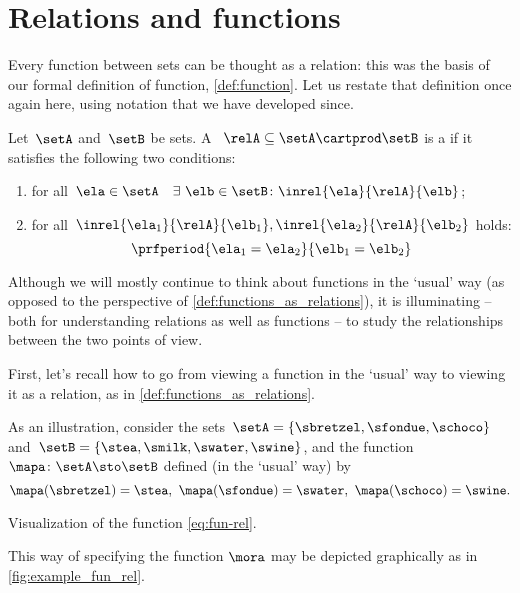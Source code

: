 
\section{Relations and functions}


Every function between sets can be thought as a relation: this was the basis of our formal definition of function, \cref{def:function}.
Let us restate that definition once again here, using notation that we have developed since.

\begin{definition}
    \label{def:functions_as_relations}
    Let~$\setA$ and~$\setB$ be sets. A ~$\relA \subseteq \setA \cartprod \setB$ is a \emph{} if it satisfies the following two conditions:
    \begin{enumerate}
        \item for all~$\ela \in \setA \quad \exists \ \elb \in \setB\colon  \inrel{\ela}{\relA}{\elb}$;
        \item for all~$\inrel{\ela_1}{\relA}{\elb_1}, \inrel{\ela_2}{\relA}{\elb_2}$ holds:
              \begin{equation*}
                  \prfperiod{\ela_1 = \ela_2}{\elb_1 = \elb_2}
              \end{equation*}
    \end{enumerate}
\end{definition}

Although we will mostly continue to think about functions in the `usual' way (as opposed to the perspective of \cref{def:functions_as_relations}), it is illuminating -- both for understanding relations as well as functions -- to study the relationships between the two points of view.

First, let's recall how to go from viewing a function in the `usual' way to viewing it as a relation, as in \cref{def:functions_as_relations}.

As an illustration, consider the sets~$\setA = \{ \sbretzel, \sfondue, \schoco \}$ and~$\setB = \{ \stea, \smilk, \swater, \swine \}$, and the function~$\mapa \colon \setA \sto \setB$ defined (in the `usual' way) by
\begin{equation*}
    \mapa (\sbretzel) = \stea, \ \mapa (\sfondue) = \swater, \ \mapa(\schoco) = \swine.
\end{equation*}
\begin{marginfigure}
    \centering
    \caption{Visualization of the function \cref{eq:fun-rel}.}
    \label{fig:example_fun_rel}
\end{marginfigure}
This way of specifying the function $\mora$ may be depicted graphically as in \cref{fig:example_fun_rel}.

